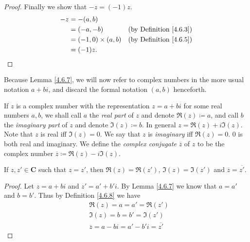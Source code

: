\begin{proof}
    Finally we show that \(-z = (-1) z\).
    \begin{align*}
        -z & = -(a, b)                                                    \\
           & = (-a, -b)              & \text{(by Definition \ref{4.6.3})} \\
           & = (-1, 0) \times (a, b) & \text{(by Definition \ref{4.6.5})} \\
           & = (-1) z.
    \end{align*}
\end{proof}

\begin{note}
    Because Lemma \ref{4.6.7}, we will now refer to complex numbers in the more usual notation \(a + bi\), and discard the formal notation \((a, b)\) henceforth.
\end{note}

\begin{definition}\label{4.6.8}
    If \(z\) is a complex number with the representation \(z = a + bi\) for some real numbers \(a, b\), we shall call \(a\) the \emph{real part} of \(z\) and denote \(\Re(z) \coloneqq a\), and call \(b\) the \emph{imaginary part} of \(z\) and denote \(\Im(z) \coloneqq b\).
    In general \(z = \Re(z) + i \Im(z)\).
    Note that \(z\) is real iff \(\Im(z) = 0\).
    We say that \(z\) is \emph{imaginary} iff \(\Re(z) = 0\).
    \(0\) is both real and imaginary.
    We define the \emph{complex conjugate} \(\overline{z}\) of \(z\) to be the complex number \(\overline{z} \coloneqq \Re(z) - i \Im(z)\).
\end{definition}

\begin{additional corollary}\label{ac 4.6.4}
If \(z, z' \in \mathbf{C}\) such that \(z = z'\), then \(\Re(z) = \Re(z')\), \(\Im(z) = \Im(z')\) and \(\overline{z} = \overline{z'}\).
\end{additional corollary}

\begin{proof}
    Let \(z = a + bi\) and \(z' = a' + b' i\).
    By Lemma \ref{4.6.7} we know that \(a = a'\) and \(b = b'\).
    Thus by Definition \ref{4.6.8} we have
    \begin{align*}
         & \Re(z) = a = a' = \Re(z')                         \\
         & \Im(z) = b = b' = \Im(z')                         \\
         & \overline{z} = a - bi = a' - b' i = \overline{z'}
    \end{align*}
\end{proof}

